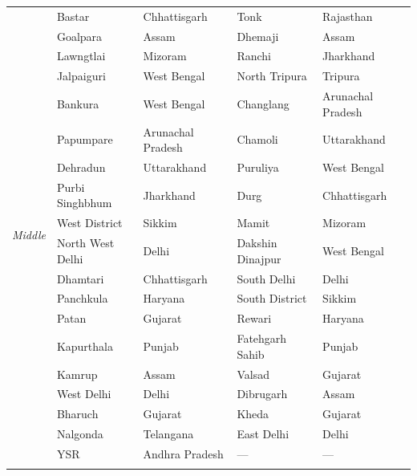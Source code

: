 \documentclass{article}
\begin{document}
\begin{longtable}{@{}p{2.8cm}p{3.2cm}p{3.2cm}p{3.2cm}p{3.2cm}@{}}
\multirow{19}{*}{\textit{Middle}}
  & Bastar         & Chhattisgarh        & Tonk             & Rajasthan          \\
  & Goalpara       & Assam               & Dhemaji          & Assam              \\
  & Lawngtlai      & Mizoram             & Ranchi           & Jharkhand          \\
  & Jalpaiguri     & West Bengal         & North Tripura    & Tripura            \\
  & Bankura        & West Bengal         & Changlang        & Arunachal Pradesh  \\
  & Papumpare      & Arunachal Pradesh   & Chamoli          & Uttarakhand        \\
  & Dehradun       & Uttarakhand         & Puruliya         & West Bengal        \\
  & Purbi Singhbhum & Jharkhand          & Durg             & Chhattisgarh       \\
  & West District  & Sikkim              & Mamit            & Mizoram            \\
  & North West Delhi & Delhi             & Dakshin Dinajpur & West Bengal        \\
  & Dhamtari       & Chhattisgarh        & South Delhi      & Delhi              \\
  & Panchkula      & Haryana             & South District   & Sikkim             \\
  & Patan          & Gujarat             & Rewari           & Haryana            \\
  & Kapurthala     & Punjab              & Fatehgarh Sahib  & Punjab             \\
  & Kamrup         & Assam               & Valsad           & Gujarat            \\
  & West Delhi     & Delhi               & Dibrugarh        & Assam              \\
  & Bharuch        & Gujarat             & Kheda            & Gujarat            \\
  & Nalgonda       & Telangana           & East Delhi       & Delhi              \\
  & YSR            & Andhra Pradesh      & ---              & ---                \\
\addlinespace[6pt]


\end{longtable}
\end{document}
